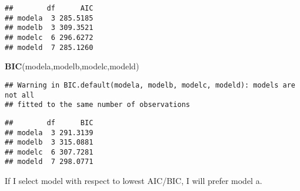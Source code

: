 \documentclass[]{article}
\newenvironment{Shaded}{\begin{snugshade}}{\end{snugshade}}
\newcommand{\KeywordTok}[1]{\textcolor[rgb]{0.13,0.29,0.53}{\textbf{#1}}}
\newcommand{\NormalTok}[1]{#1}
\begin{document}
\begin{verbatim}
##        df      AIC
## modela  3 285.5185
## modelb  3 309.3521
## modelc  6 296.6272
## modeld  7 285.1260
\end{verbatim}

\begin{Shaded}
\begin{Highlighting}[]
\KeywordTok{BIC}\NormalTok{(modela,modelb,modelc,modeld)}
\end{Highlighting}
\end{Shaded}

\begin{verbatim}
## Warning in BIC.default(modela, modelb, modelc, modeld): models are not all
## fitted to the same number of observations
\end{verbatim}

\begin{verbatim}
##        df      BIC
## modela  3 291.3139
## modelb  3 315.0881
## modelc  6 307.7281
## modeld  7 298.0771
\end{verbatim}

\indent If I select model with respect to lowest AIC/BIC, I will prefer
model a.
\end{document}
